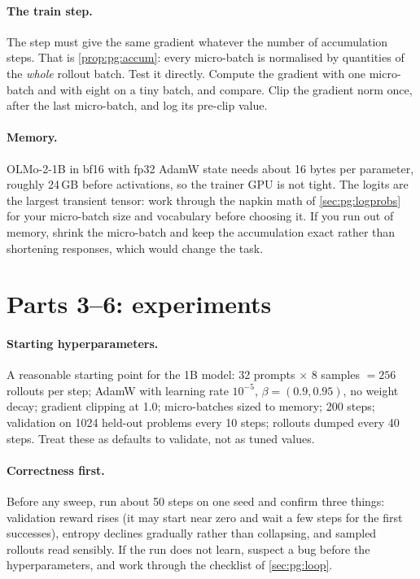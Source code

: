 \paragraph{The train step.} The step must give the same gradient whatever the number of
accumulation steps. That is \cref{prop:pg:accum}: every micro-batch is normalised by quantities of the
\emph{whole} rollout batch. Test it directly. Compute the gradient with one micro-batch and with eight
on a tiny batch, and compare. Clip the gradient norm once, after the last micro-batch, and log its
pre-clip value.

\paragraph{Memory.} OLMo-2-1B in bf16 with fp32 AdamW state needs about 16 bytes per parameter,
roughly 24\,GB before activations, so the trainer GPU is not tight. The logits are the largest
transient tensor: work through the napkin math of \cref{sec:pg:logprobs} for your micro-batch size and
vocabulary before choosing it. If you run out of memory, shrink the micro-batch and keep the
accumulation exact rather than shortening responses, which would change the task.

\section{Parts 3--6: experiments}\label{sec:proj5:experiments}

\paragraph{Starting hyperparameters.} A reasonable starting point for the 1B model: 32 prompts
$\times$ 8 samples $=256$ rollouts per step; AdamW with learning rate $10^{-5}$, $\beta=(0.9,0.95)$,
no weight decay; gradient clipping at 1.0; micro-batches sized to memory; 200 steps; validation on
1024 held-out problems every 10 steps; rollouts dumped every 40 steps. Treat these as defaults to
validate, not as tuned values.

\paragraph{Correctness first.} Before any sweep, run about 50 steps on one seed and confirm three
things: validation reward rises (it may start near zero and wait a few steps for the first successes),
entropy declines gradually rather than collapsing, and sampled rollouts read sensibly. If the run
does not learn, suspect a bug before the hyperparameters, and work through the checklist of
\cref{sec:pg:loop}.


